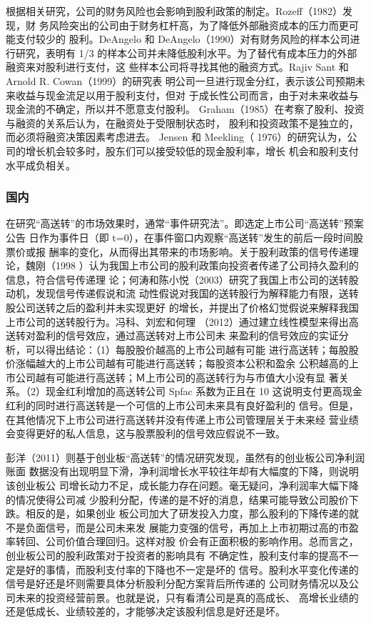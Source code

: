 \documentclass[../main]{subfiles}
\begin{document}
根据相关研究，公司的财务风险也会影响到股利政策的制定。Rozeff（1982）发现，财
务风险突出的公司由于财务杠杆高，为了降低外部融资成本的压力而更可能支付较少的
股利。DeAngelo 和 DeAngelo（1990）对有财务风险的样本公司进行研究，表明有 1/3
的样本公司并未降低股利水平。为了替代有成本压力的外部融资来对股利进行支付，这
些样本公司将寻找其他的融资方式。Rajiv Sant 和 Arnold R. Cowan（1999）的研究表
明公司一旦进行现金分红，表示该公司预期未来收益与现金流足以用于股利支付，但对
于成长性公司而言，由于对未来收益与现金流的不确定，所以并不愿意支付股利。
Graham（1985）在考察了股利、投资与融资的关系后认为，在融资处于受限制状态时，
股利和投资政策不是独立的，而必须将融资决策因素考虑进去。 Jensen 和 Meekling（
1976）的研究认为，公司的增长机会较多时，股东们可以接受较低的现金股利率，增长
机会和股利支付水平成负相关。

\subsubsection{国内}%
\label{ssub:national}

在研究“高送转”的市场效果时，通常“事件研究法”。即选定上市公司“高送转”预案公告
日作为事件日（即 t=0），在事件窗口内观察“高送转”发生的前后一段时间股票价或报
酬率的变化，从而得出其带来的市场影响。关于股利政策的信号传递理论，魏刚（1998
）认为我国上市公司的股利政策向投资者传递了公司持久盈利的信息，符合信号传递理
论；何涛和陈小悦（2003）研究了我国上市公司的送转股动机，发现信号传递假说和流
动性假说对我国的送转股行为解释能力有限，送转股公司送转之后的盈利并未实现更好
的增长，并提出了价格幻觉假说来解释我国上市公司的送转股行为。冯科、刘宏和何理
（2012）通过建立线性模型来得出高送转对盈利的信号效应，通过高送转对上市公司未
来盈利的信号效应的实证分析，可以得出结论：（1）每股股价越高的上市公司越有可能
进行高送转；每股股价涨幅越大的上市公司越有可能进行高送转；每股资本公积和盈余
公积越高的上市公司越有可能进行高送转；Ｍ上市公司的高送转行为与市值大小没有显
著关系。（2）现金红利增加的高送转公司 Spfac 系数为正且在 10%
这说明支付更高现金红利的同时进行高送转是一个可信的上市公司未来具有良好盈利的
信号。但是，在其他情况下上市公司进行高送转并没有传递上市公司管理层关于未来经
营业绩会变得更好的私人信息，这与股票股利的信号效应假说不一致。

彭洋（2011）则基于创业板“高送转”的情况研究发现，虽然有的创业板公司净利润账面
数据没有出现明显下滑，净利润增长水平较往年却有大幅度的下降，则说明该创业板公
司增长动力不足，成长能力存在问题。毫无疑问，净利润率大幅下降的情况使得公司减
少股利分配，传递的是不好的消息，结果可能导致公司股价下跌。相反的是，如果创业
板公司加大了研发投入力度，那么股利的下降传递的就不是负面信号，而是公司未来发
展能力变强的信号，再加上上市初期过高的市盈率转回、公司价值合理回归。这样对股
价会有正面积极的影响作用。总而言之，创业板公司的股利政策对于投资者的影响具有
不确定性，股利支付率的提高不一定是好的事情，而股利支付率的下降也不一定是坏的
信号。股利水平变化传递的信号是好还是坏则需要具体分析股利分配方案背后所传递的
公司财务情况以及公司未来的投资经营前景。也就是说，只有看清公司是真的高成长、
高增长业绩的还是低成长、业绩较差的，才能够决定该股利信息是好还是坏。
\end{document}
